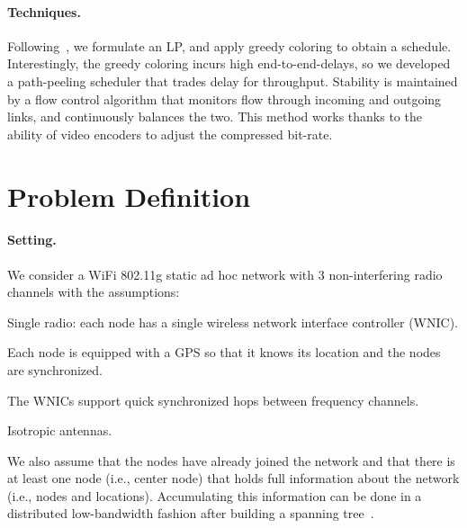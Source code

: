 \documentclass[12pt]{article}
\newenvironment{proof sketch}[1]{\noindent {\emph{Proof sketch of #1:}}}{\hfill \qed}
\begin{document}
\paragraph{Techniques.}
Following~\cite{kumar2005algorithmic,alicherry2005joint11,buragohain2007improved,ChafekarCapacity},
we formulate an LP, and apply greedy coloring to obtain a schedule.
Interestingly, the greedy coloring incurs high end-to-end-delays, so
we developed a path-peeling scheduler that trades delay for
throughput. Stability is maintained by a flow control algorithm that
monitors flow through incoming and outgoing links, and continuously
balances the two. This method works thanks to the ability of video
encoders to adjust the compressed bit-rate.

\section{Problem Definition}\label{sec:problem}
\paragraph{Setting.}
We consider a WiFi 802.11g static ad hoc network with $3$ non-interfering radio
channels with the assumptions:
\begin{inparaenum}[(i)]
\item Single radio: each node has a single wireless network interface
  controller (WNIC).
\item Each node is equipped with a GPS so that it knows
  its location and the nodes are synchronized.
\item The WNICs support quick synchronized hops between frequency
  channels.
\item Isotropic antennas.
\item We also assume that the nodes have already joined the network
  and that there is at least one node (i.e., center node) that holds
  full information about the network (i.e., nodes and locations).
  Accumulating this information can be done in a distributed
  low-bandwidth fashion after building a spanning
  tree~\cite{awerbuch1987optimal}.
\end{inparaenum}
\end{document}
